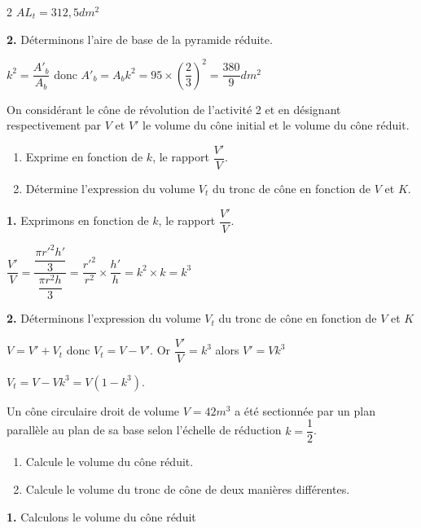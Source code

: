 \begin{multicols*}{2}
  	$AL_{t}= 312,5dm^2$
  	
  	\textbf{2.} Déterminons l'aire de base de la pyramide réduite.
  	
  	$k^2=\dfrac{A'_{b}}{A_{b}}$ donc $A'_{b}=A_{b}k^2=95\times \left(\dfrac{2}{3} \right) ^2=\dfrac{380}{9} dm^2$ 
  	
  	On considérant le cône de révolution de l'activité 2 et en désignant  respectivement par $V$ et $V'$ le volume du cône initial et le volume du cône réduit. 
  	\begin{enumerate}
  		\item Exprime en fonction de $k$, le rapport $\dfrac{V'}{V}$. 
  		\item Détermine l'expression du volume  $V_{t}$ du tronc de cône en fonction de $V$ et $K$. 
  	\end{enumerate}
  	\dure
  	\resul
  	\textbf{1.} Exprimons en fonction de $k$, le rapport $\dfrac{V'}{V}$.
  	
  	$\dfrac{V'}{V}=\dfrac{\dfrac{\pi r'^2h'}{3}}{\dfrac{\pi r^2h}{3}}=\dfrac{ r'^2}{r^2}\times \dfrac{h'}{h}=k^2\times k= k^3$ 
  	
  	\textbf{2.} Déterminons l'expression du volume  $V_{t}$ du tronc de cône en fonction de $V$ et $K$
  	
  	$V=V'+V_{t}$ donc $V_{t}=V-V'$. Or $\dfrac{V'}{V}= k^3$ alors $V'=Vk^3$
  	
  	$V_{t}=V-Vk^3=V\left(1-k^3\right)$. 
  	
  	
  	
  	Un cône circulaire droit de volume  $V=42 m^3$ a été sectionnée par un plan parallèle au plan de sa base selon l'échelle de réduction $k=\dfrac{1}{2}$.
  	
  	\begin{enumerate}
  		\item Calcule le volume du cône réduit. 
  		\item Calcule le volume du tronc de cône de deux manières différentes. 
  	\end{enumerate}
  	\dure
  	\resul
  	\textbf{1.}  Calculons le volume du cône réduit
  	

\end{multicols*}
